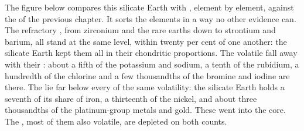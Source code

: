 The figure below compares this silicate Earth with , element by
element, against the  of the previous chapter. It sorts
the elements in a way no other evidence can. The refractory , from zirconium and the rare earths down to strontium and barium, all
stand at the same level, within twenty per cent of one another: the silicate Earth
kept them all in their chondritic proportions. The volatile 
fall away with their : about a fifth of the potassium
and sodium, a tenth of the rubidium, a hundredth of the chlorine and a few
thousandths of the bromine and iodine are there. The  lie far below every 
of the same volatility: the silicate Earth holds a seventh of its share of
iron, a thirteenth of the nickel, and about three thousandths of the
platinum-group metals and gold. These went into the core. The , most of them also volatile, are depleted on both counts.

